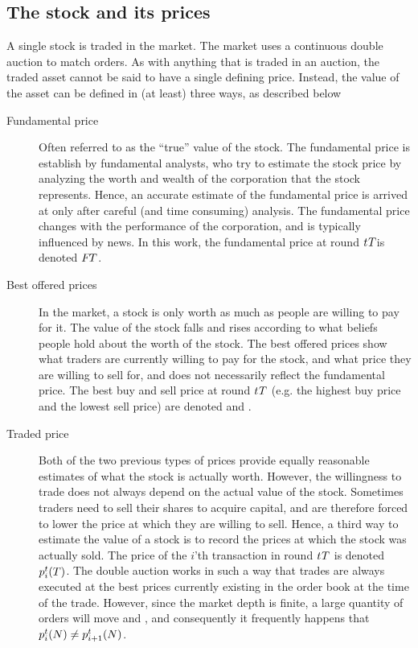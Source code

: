 \subsection{The stock and its prices}
A single stock is traded in the market. The market uses a continuous double auction to match orders. As with anything that is traded in an auction, the traded asset cannot be said to have a single defining price. Instead, the value of the asset can be defined in (at least) three ways, as described below

\begin{description}
\item[Fundamental price] Often referred to as the ``true'' value of the stock. The fundamental price is establish by fundamental analysts, who try to estimate the stock price by analyzing the worth and wealth of the corporation that the stock represents. Hence, an accurate estimate of the fundamental price is arrived at only after careful (and time consuming) analysis. The fundamental price changes with the performance of the corporation, and is typically influenced by news. In this work, the fundamental price at round $\round{T}$is denoted $\fundamentalprice{T}$.
\item[Best offered prices] In the market, a stock is only worth as much as people are willing to pay for it. The value of the stock falls and rises according to what beliefs people hold about the worth of the stock. The best offered prices show what traders are currently willing to pay for the stock, and what price they are willing to sell for, and does not necessarily reflect the fundamental price. The best buy and sell price at round $\round{T}$ (e.g. the highest buy price and the lowest sell price) are denoted  and .
\item[Traded price] Both of the two previous types of prices provide equally reasonable estimates of what the stock is actually worth. However, the willingness to trade does not always depend on the actual value of the stock. Sometimes traders need to sell their shares to acquire capital, and are therefore forced to lower the price at which they are willing to sell. Hence, a third way to estimate the value of a stock is to record the prices at which the stock was actually sold. The price of the $i$'th transaction in round $\round{T}$ is denoted $\tradeprice{T}{i}$. The double auction works in such a way that trades are always executed at the best prices currently existing in the order book at the time of the trade. However, since the market depth is finite, a large quantity of orders will move  and , and consequently it frequently happens that $\tradeprice{N}{i} \neq \tradeprice{N}{i+1}$.
\end{description}


